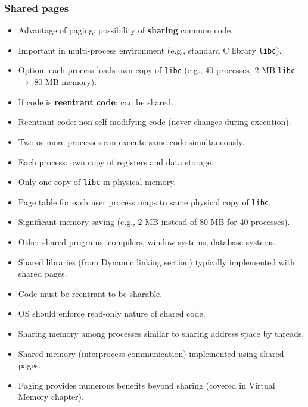 \subsubsection*{Shared pages}
\begin{itemize}
    \item Advantage of paging: possibility of \textbf{sharing} common code.
    \item Important in multi-process environment (e.g., standard C library \texttt{libc}).
    \item Option: each process loads own copy of \texttt{libc} (e.g., 40 processes, 2 MB \texttt{libc} $\rightarrow$ 80 MB memory).
    \item If code is \textbf{reentrant code}: can be shared.
    \item Reentrant code: non-self-modifying code (never changes during execution).
    \item Two or more processes can execute same code simultaneously.
    \item Each process: own copy of registers and data storage.
    \item Only one copy of \texttt{libc} in physical memory.
    \item Page table for each user process maps to same physical copy of \texttt{libc}.
    \item Significant memory saving (e.g., 2 MB instead of 80 MB for 40 processes).
    \item Other shared programs: compilers, window systems, database systems.
    \item Shared libraries (from Dynamic linking section) typically implemented with shared pages.
    \item Code must be reentrant to be sharable.
    \item OS should enforce read-only nature of shared code.
    \item Sharing memory among processes similar to sharing address space by threads.
    \item Shared memory (interprocess communication) implemented using shared pages.
    \item Paging provides numerous benefits beyond sharing (covered in Virtual Memory chapter).
\end{itemize}

